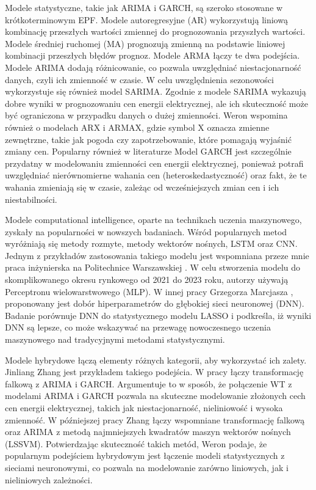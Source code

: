 Modele statystyczne, takie jak ARIMA i GARCH, są szeroko stosowane w krótkoterminowym EPF. Modele autoregresyjne (AR) wykorzystują liniową kombinację przeszłych wartości zmiennej do prognozowania przyszłych wartości. Modele średniej ruchomej (MA) prognozują zmienną na podstawie liniowej kombinacji przeszłych błędów prognoz. Modele ARMA łączy te dwa podejścia. Modele ARIMA dodają różnicowanie, co pozwala uwzględniać niestacjonarność danych, czyli ich zmienność w czasie. W celu uwzględnienia sezonowości wykorzystuje się również model SARIMA. Zgodnie z \cite{appliedmath3020018} modele SARIMA wykazują dobre wyniki w prognozowaniu cen energii elektrycznej, ale ich skuteczność może być ograniczona w przypadku danych o dużej zmienności. Weron \cite{WERON20141030} wspomina również o modelach ARX i ARMAX, gdzie symbol X oznacza zmienne zewnętrzne, takie jak pogoda czy zapotrzebowanie, które pomagają wyjaśnić zmiany cen. Popularny również w literaturze Model GARCH jest szczególnie przydatny w modelowaniu zmienności cen energii elektrycznej, ponieważ potrafi uwzględniać nierównomierne wahania cen (heteroskedastyczność) oraz fakt, że te wahania zmieniają się w czasie, zależąc od wcześniejszych zmian cen i ich niestabilności.

Modele computational intelligence, oparte na technikach uczenia maszynowego, zyskały na popularności w nowszych badaniach. Wśród popularnych metod wyróżniają się metody rozmyte, metody wektorów nośnych, LSTM oraz CNN. Jednym z przykładów zastosowania takiego modelu jest wspomniana przeze mnie praca inżynierska na Politechnice Warszawskiej \cite{MGR2025}. W celu stworzenia modelu do skomplikowanego okresu rynkowego od 2021 do 2023 roku, autorzy używają Perceptronu wielowarstwowego (MLP). W innej pracy Grzegorza Marcjasza \cite{en13184605}, proponowany jest dobór hiperparametrów do głębokiej sieci neuronowej (DNN). Badanie porównuje DNN do statystycznego modelu LASSO i podkreśla, iż wyniki DNN są lepsze, co może wskazywać na przewagę nowoczesnego uczenia maszynowego nad tradycyjnymi metodami statystycznymi.

Modele hybrydowe łączą elementy różnych kategorii, aby wykorzystać ich zalety. Jinliang Zhang jest przykładem takiego podejścia. W pracy \cite{TAN20103606} łączy transformację falkową z ARIMA i GARCH. Argumentuje to w sposób, że połączenie WT z modelami ARIMA i GARCH pozwala na skuteczne modelowanie złożonych cech cen energii elektrycznej, takich jak niestacjonarność, nieliniowość i wysoka zmienność. W późniejszej pracy Zhang \cite{ZHANG2012695} łączy wspomniane transformację falkową oraz ARIMA z metodą najmniejszych kwadratów maszyn wektorów nośnych (LSSVM). Potwierdzając skuteczność takich metód, Weron \cite{WERON20141030} podaje, że popularnym podejściem hybrydowym jest łączenie modeli statystycznych z sieciami neuronowymi, co pozwala na modelowanie zarówno liniowych, jak i nieliniowych zależności.

